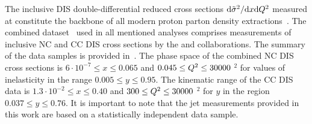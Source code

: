 The inclusive DIS double-differential reduced cross sections $\mathrm{d}\tilde\sigma^2/\mathrm{d}x\mathrm{d}\mbox{${Q^2}$}$ measured at \hera constitute the backbone of all modern proton parton density extractions~\cite{Lai:2010vv,Martin:2009iq,Alekhin:2012ig,Ball:2011uy,Aaron:2009aa}. The combined dataset~\cite{Aaron:2009aa} used in all mentioned analyses comprises measurements of inclusive NC and CC DIS cross sections by the \hone and \zeus collaborations. The summary of the data samples is provided in~\cite{Aaron:2009aa}. The phase space of the combined NC DIS cross sections is $6\cdot 10^{-7} \le x \le 0.065$ and $0.045 \le \mbox{${Q^2}$} \le 30000$ \GeV$^2$ for values of inelasticity in the range $0.005 \le y \le 0.95$. The kinematic range of the CC DIS data is $1.3\cdot 10^{-2} \le x \le 0.40$ and $300 \le \mbox{${Q^2}$} \le 30000$ \GeV$^2$ for $y$ in the region $0.037 \le y \le 0.76$. It is important to note that the jet measurements provided in this work are based on a statistically independent data sample.

